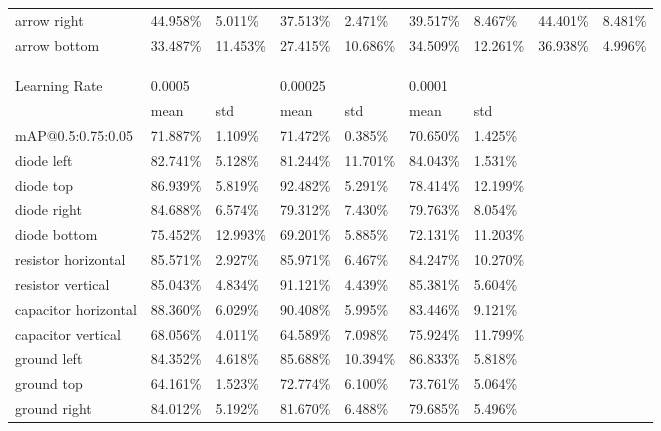 \begin{table}[H]
\begin{center}
\begin{tabular}{|l|l|l|l|l|l|l|l|l|}
arrow right                     & 44.958\% & 5.011\%  & 37.513\% & 2.471\%  & 39.517\% & 8.467\%  & 44.401\% & 8.481\%   \\
\rowcolor{lightgray!50}
arrow bottom                    & 33.487\% & 11.453\% & 27.415\% & 10.686\% & 34.509\% & 12.261\% & 36.938\% & 4.996\%   \\
\hline
\\\\\\
\hline
Learning Rate                   & 0.0005   &          & 0.00025  &          & 0.0001   &           & & \\
\hline
                                & mean     & std      & mean     & std      & mean     & std       & & \\
\hline
mAP@0.5:0.75:0.05               & 71.887\% & 1.109\%  & 71.472\% & 0.385\%  &  70.650\% & 1.425\%  & & \\
\hline
\rowcolor{lightgray!50}
diode left                      & 82.741\% & 5.128\%  & 81.244\% & 11.701\% &  84.043\% & 1.531\%  & & \\
diode top                       & 86.939\% & 5.819\%  & 92.482\% & 5.291\%  &  78.414\% & 12.199\% & & \\
\rowcolor{lightgray!50}
diode right                     & 84.688\% & 6.574\%  & 79.312\% & 7.430\%  &  79.763\% & 8.054\%  & & \\
diode bottom                    & 75.452\% & 12.993\% & 69.201\% & 5.885\%  &  72.131\% & 11.203\% & & \\
\rowcolor{lightgray!50}
resistor horizontal             & 85.571\% & 2.927\%  & 85.971\% & 6.467\%  &  84.247\% & 10.270\% & & \\
resistor vertical               & 85.043\% & 4.834\%  & 91.121\% & 4.439\%  &  85.381\% & 5.604\%  & & \\
\rowcolor{lightgray!50}
capacitor horizontal            & 88.360\% & 6.029\%  & 90.408\% & 5.995\%  &  83.446\% & 9.121\%  & & \\
capacitor vertical              & 68.056\% & 4.011\%  & 64.589\% & 7.098\%  &  75.924\% & 11.799\% & & \\
\rowcolor{lightgray!50}
ground left                     & 84.352\% & 4.618\%  & 85.688\% & 10.394\% &  86.833\% & 5.818\%  & & \\
ground top                      & 64.161\% & 1.523\%  & 72.774\% & 6.100\%  &  73.761\% & 5.064\%  & & \\
\rowcolor{lightgray!50}
ground right                    & 84.012\% & 5.192\%  & 81.670\% & 6.488\%  &  79.685\% & 5.496\%  & & \\

\end{tabular}
\end{center}
\end{table}
